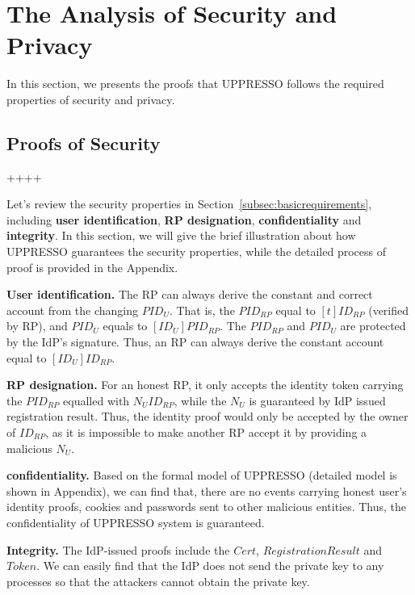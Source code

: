 \section{The Analysis of Security and Privacy}
In this section, we presents the proofs that UPPRESSO follows the required properties of security and privacy.


\subsection{Proofs of Security}

++++

Let's review the security properties in Section~\ref{subsec:basicrequirements}, including \textbf{user identification}, \textbf{RP designation}, \textbf{confidentiality} and \textbf{integrity}. In this section, we will give the brief illustration about how UPPRESSO guarantees the security properties, while the detailed process of proof is provided in the Appendix.

\noindent\textbf{User identification.}
The RP can always derive the constant and correct account from the changing $PID_U$. That is, the $PID_{RP}$ equal to $[t]ID_{RP}$ (verified by RP), and $PID_U$ equals to $[ID_U]PID_{RP}$. The $PID_{RP}$ and $PID_U$ are protected by the IdP's signature.
Thus, an RP can always derive the constant account equal to $[ID_U]ID_{RP}$.

\noindent\textbf{RP designation.}
For an honest RP, it only accepts the identity token carrying the $PID_{RP}$ equalled with $N_UID_{RP}$, while the $N_U$ is guaranteed by IdP issued registration result. Thus, the identity proof would only be accepted by the owner of $ID_{RP}$, as it is impossible to make another RP accept it by providing a malicious $N_U$.


\noindent\textbf{confidentiality.}
Based on the formal model of UPPRESSO (detailed model is shown in Appendix), we can find that, there are no events carrying honest user's identity proofs, cookies and passwords sent to other malicious entities. Thus, the confidentiality of UPPRESSO system is guaranteed.


\noindent\textbf{Integrity.}
The IdP-issued proofs include the $Cert$, $RegistrationResult$ and $Token$. We can easily find that the IdP does not send the private key to any processes so that the attackers cannot obtain the private key.

